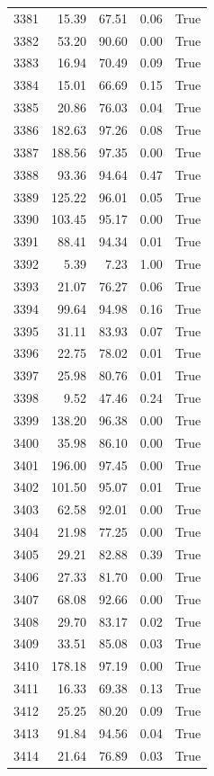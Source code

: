 \begin{longtable}{rrrrr}
3381 & 15.39 & 67.51 & 0.06 & True \\
3382 & 53.20 & 90.60 & 0.00 & True \\
3383 & 16.94 & 70.49 & 0.09 & True \\
3384 & 15.01 & 66.69 & 0.15 & True \\
3385 & 20.86 & 76.03 & 0.04 & True \\
3386 & 182.63 & 97.26 & 0.08 & True \\
3387 & 188.56 & 97.35 & 0.00 & True \\
3388 & 93.36 & 94.64 & 0.47 & True \\
3389 & 125.22 & 96.01 & 0.05 & True \\
3390 & 103.45 & 95.17 & 0.00 & True \\
3391 & 88.41 & 94.34 & 0.01 & True \\
3392 & 5.39 & 7.23 & 1.00 & True \\
3393 & 21.07 & 76.27 & 0.06 & True \\
3394 & 99.64 & 94.98 & 0.16 & True \\
3395 & 31.11 & 83.93 & 0.07 & True \\
3396 & 22.75 & 78.02 & 0.01 & True \\
3397 & 25.98 & 80.76 & 0.01 & True \\
3398 & 9.52 & 47.46 & 0.24 & True \\
3399 & 138.20 & 96.38 & 0.00 & True \\
3400 & 35.98 & 86.10 & 0.00 & True \\
3401 & 196.00 & 97.45 & 0.00 & True \\
3402 & 101.50 & 95.07 & 0.01 & True \\
3403 & 62.58 & 92.01 & 0.00 & True \\
3404 & 21.98 & 77.25 & 0.00 & True \\
3405 & 29.21 & 82.88 & 0.39 & True \\
3406 & 27.33 & 81.70 & 0.00 & True \\
3407 & 68.08 & 92.66 & 0.00 & True \\
3408 & 29.70 & 83.17 & 0.02 & True \\
3409 & 33.51 & 85.08 & 0.03 & True \\
3410 & 178.18 & 97.19 & 0.00 & True \\
3411 & 16.33 & 69.38 & 0.13 & True \\
3412 & 25.25 & 80.20 & 0.09 & True \\
3413 & 91.84 & 94.56 & 0.04 & True \\
3414 & 21.64 & 76.89 & 0.03 & True \\

\end{longtable}
